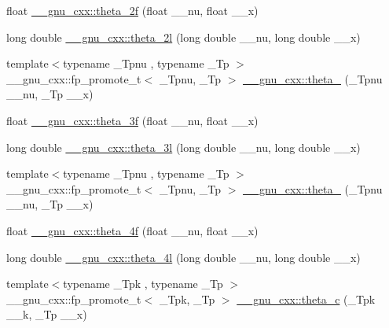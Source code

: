 \begin{DoxyCompactItemize}
float \hyperlink{group__gnu__math__spec__func_ga78e832796aedf5159b142801e1184392}{\+\_\+\+\_\+gnu\+\_\+cxx\+::theta\+\_\+2f} (float \+\_\+\+\_\+nu, float \+\_\+\+\_\+x)
\item 
long double \hyperlink{group__gnu__math__spec__func_gac5a30c772d4888442665945e7f3fa017}{\+\_\+\+\_\+gnu\+\_\+cxx\+::theta\+\_\+2l} (long double \+\_\+\+\_\+nu, long double \+\_\+\+\_\+x)
\item 
{\footnotesize template$<$typename \+\_\+\+Tpnu , typename \+\_\+\+Tp $>$ }\\\+\_\+\+\_\+gnu\+\_\+cxx\+::fp\+\_\+promote\+\_\+t$<$ \+\_\+\+Tpnu, \+\_\+\+Tp $>$ \hyperlink{group__gnu__math__spec__func_ga146c3b8e86991e164d4bf143cda5f0fc}{\+\_\+\+\_\+gnu\+\_\+cxx\+::theta\+\_} (\+\_\+\+Tpnu \+\_\+\+\_\+nu, \+\_\+\+Tp \+\_\+\+\_\+x)
\item 
float \hyperlink{group__gnu__math__spec__func_ga9a7c967d2a456f1a6aceee9a53f024b1}{\+\_\+\+\_\+gnu\+\_\+cxx\+::theta\+\_\+3f} (float \+\_\+\+\_\+nu, float \+\_\+\+\_\+x)
\item 
long double \hyperlink{group__gnu__math__spec__func_gaf88874ff6c69940d2191f7947d2ea119}{\+\_\+\+\_\+gnu\+\_\+cxx\+::theta\+\_\+3l} (long double \+\_\+\+\_\+nu, long double \+\_\+\+\_\+x)
\item 
{\footnotesize template$<$typename \+\_\+\+Tpnu , typename \+\_\+\+Tp $>$ }\\\+\_\+\+\_\+gnu\+\_\+cxx\+::fp\+\_\+promote\+\_\+t$<$ \+\_\+\+Tpnu, \+\_\+\+Tp $>$ \hyperlink{group__gnu__math__spec__func_ga8a6f8b69272a9f205a13e1745832ada3}{\+\_\+\+\_\+gnu\+\_\+cxx\+::theta\+\_} (\+\_\+\+Tpnu \+\_\+\+\_\+nu, \+\_\+\+Tp \+\_\+\+\_\+x)
\item 
float \hyperlink{group__gnu__math__spec__func_ga0c5cbf87e304844ed4c3423be5ca09a5}{\+\_\+\+\_\+gnu\+\_\+cxx\+::theta\+\_\+4f} (float \+\_\+\+\_\+nu, float \+\_\+\+\_\+x)
\item 
long double \hyperlink{group__gnu__math__spec__func_gaaf63a80e90cdcdd66ebb18cd3a84afae}{\+\_\+\+\_\+gnu\+\_\+cxx\+::theta\+\_\+4l} (long double \+\_\+\+\_\+nu, long double \+\_\+\+\_\+x)
\item 
{\footnotesize template$<$typename \+\_\+\+Tpk , typename \+\_\+\+Tp $>$ }\\\+\_\+\+\_\+gnu\+\_\+cxx\+::fp\+\_\+promote\+\_\+t$<$ \+\_\+\+Tpk, \+\_\+\+Tp $>$ \hyperlink{group__gnu__math__spec__func_ga3ebbb6513c39e1d55b08cba7d169ce3d}{\+\_\+\+\_\+gnu\+\_\+cxx\+::theta\+\_\+c} (\+\_\+\+Tpk \+\_\+\+\_\+k, \+\_\+\+Tp \+\_\+\+\_\+x)
\item 

\end{DoxyCompactItemize}
